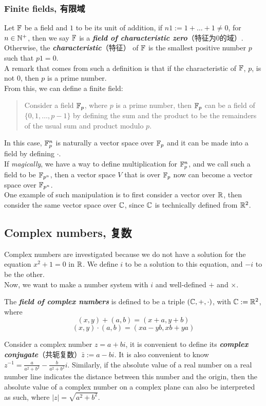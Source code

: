 \subsubsection{Finite fields, 有限域}
Let $\mathbb{F}$ be a field and $1$ to be its unit of addition, if $n1 := 1 + \dots + 1 \ne 0$, for $n \in \mathbb{N}^{+}$, then we say $\mathbb{F}$ is a \textbf{\textit{field of characteristic zero}}（特征为0的域）. Otherwise, the \textbf{\textit{characteristic}}（特征） of $\mathbb{F}$ is the smallest positive number $p$ such that $p1 = 0$. \\
A remark that comes from such a definition is that if the characteristic of $\mathbb{F}$, $p$, is not $0$, then $p$ is a prime number. \\
From this, we can define a finite field:
\begin{quote}
    Consider a field $\mathbb{F}_p$, where $p$ is a prime number, then $\mathbb{F}_p$ can be a field of $\{0, 1, \dots, p-1\}$ by defining the sum and the product to be the remainders of the usual sum and product modulo $p$.
\end{quote}
In this case, $\mathbb{F}_p^n$ is naturally a vector space over $\mathbb{F}_p$ and it can be made into a field by defining $\cdot$. \\
If \textit{magically}, we have a way to define multiplication for $\mathbb{F}_p^n$, and we call such a field to be $\mathbb{F}_{p^n}$, then a vector space $V$ that is over $\mathbb{F}_p$ now can become a vector space over $\mathbb{F}_{p^n}$. \\
One example of such manipulation is to first consider a vector over $\mathbb{R}$, then consider the same vector space over $\mathbb{C}$, since $\mathbb{C}$ is technically defined from $\mathbb{R}^2$.

\subsection{Complex numbers, 复数}
Complex numbers are investigated because we do not have a solution for the equation $x^2+1 = 0$ in $\mathbb{R}$. We define $i$ to be a solution to this equation, and $-i$ to be the other. \\
Now, we want to make a number system with $i$ and well-defined $+$ and $\times$.
\begin{definition}
    The \textbf{\textit{field of complex numbers}} is defined to be a triple $(\mathbb{C}, +, \cdot)$, with $\mathbb{C} := \mathbb{R}^2$, where
    $$(x, y) + (a, b) = (x+a, y+b)$$
    $$(x, y) \cdot (a, b) = (xa-yb, xb+ya)$$
\end{definition}
Consider a complex number $z = a + bi$, it is convenient to define its \textbf{\textit{complex conjugate}}（共轭复数）$\bar{z} := a - bi$. It is also convenient to know $z^{-1} = \frac{a}{a^2+b^2} - \frac{b}{a^2+b^2}i$. Similarly, if the absolute value of a real number on a real number line indicates the distance between this number and the origin, then the absolute value of a complex number on a complex plane can also be interpreted as such, where $|z| = \sqrt{a^2 + b^2}$.

